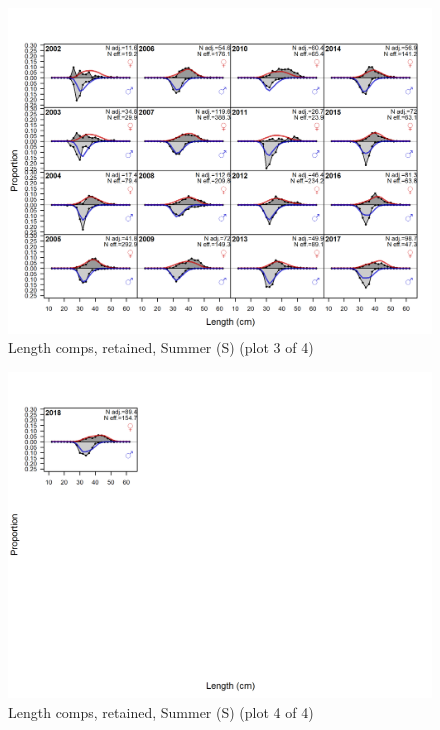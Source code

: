 \documentclass[12pt,]{article}
\begin{document}
\begin{figure}
\centering
\includegraphics{r4ss/plots_mod1/comp_lenfit_flt4mkt2_page3.png}
\caption{Length comps, retained, Summer (S) (plot 3 of 4)
\label{fig:length_fits}}
\end{figure}

\begin{figure}
\centering
\includegraphics{r4ss/plots_mod1/comp_lenfit_flt4mkt2_page4.png}
\caption{Length comps, retained, Summer (S) (plot 4 of 4)
\label{fig:length_fits}}
\end{figure}
\end{document}
